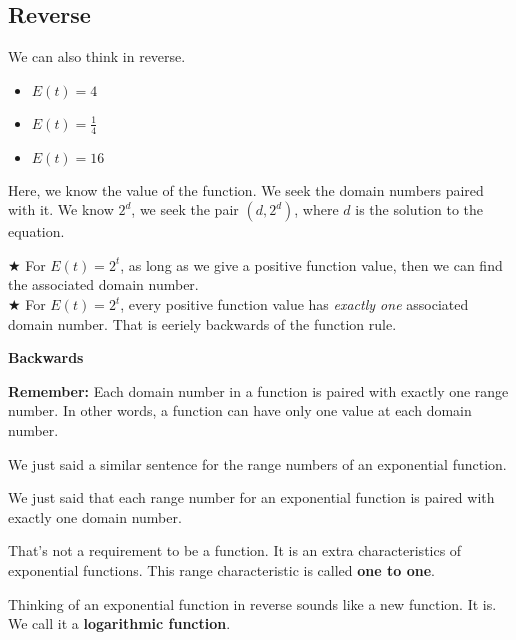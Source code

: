 \documentclass{ximera}
\begin{document}
\subsection*{Reverse}

We can also think in reverse.
\begin{itemize}
\item $E(t) = 4$
\item $E(t) = {\tfrac{1}{4}} $
\item $E(t) = 16 $
\end{itemize}


Here, we know the value of the function.  We seek the domain numbers paired with it. We know $2^d$, we seek the pair $(d, 2^d)$, where $d$ is the solution to the equation.




$\bigstar$ For $E(t) = 2^t$, as long as we give a positive function value, then we can find the associated domain number. \\ 



$\bigstar$ For $E(t) = 2^t$, every positive function value has \textit{exactly one} associated domain number. That is eeriely backwards of the function rule.\\ 



\begin{observation}  \textbf{\textcolor{red!80!black}{Backwards}}

\textbf{Remember:}  Each domain number in a function is paired with exactly one range number.  In other words, a function can have only one value at each domain number. 


We just said a similar sentence for the range numbers of an exponential function.


We just said that each range number for an exponential function is paired with exactly one domain number.

That's not a requirement to be a function.  It is an extra characteristics of exponential functions. This range characteristic is called \textbf{one to one}.



\end{observation}



Thinking of an exponential function in reverse sounds like a new function. It is. We call it a \textbf{\textcolor{purple!85!blue}{logarithmic function}}.
\end{document}
